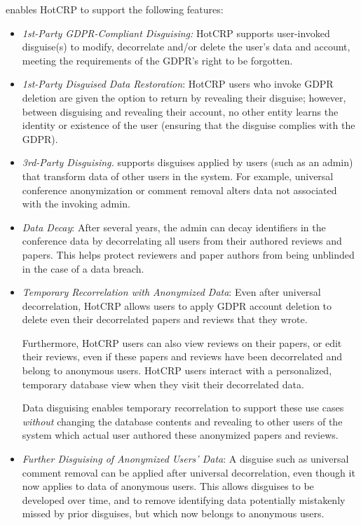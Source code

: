 \sys enables HotCRP to support the following features:
\begin{itemize}
    \item\emph{1st-Party GDPR-Compliant Disguising:}
HotCRP supports user-invoked disguise(s) to modify, decorrelate and/or delete the user's data and
account, meeting the requirements of the GDPR's right to be forgotten.

    \item \emph{1st-Party Disguised Data Restoration}: HotCRP users who invoke GDPR deletion are given the
        option to return by revealing their disguise; however, between disguising and revealing
        their account, no other entity learns the identity or existence of the user (ensuring that
        the disguise complies with the GDPR).

    \item\emph{3rd-Party Disguising.}
\sys supports disguises applied by users (such as an admin) that transform data of other users in the system. For example, universal conference anonymization or
    comment removal alters data not associated with the invoking admin.

\item \emph{Data Decay}: After several years, the admin can decay identifiers in the conference data
    by decorrelating all users from their authored reviews and papers.  This helps protect reviewers
        and paper authors from being unblinded in the case of a data breach.

\item \emph{Temporary Recorrelation with Anonymized Data}:
Even after universal decorrelation, HotCRP allows users to apply GDPR account
deletion to delete even their decorrelated papers and reviews that they wrote.
%

%
Furthermore, HotCRP users can also view reviews on their papers, or edit their reviews, even if
        these papers and reviews have been decorrelated and belong to anonymous users.  HotCRP users
        interact with a personalized, temporary database view when they visit their decorrelated
        data.

Data disguising enables temporary recorrelation to support these use cases \emph{without} changing
        the database contents and revealing to other users of the system
which actual user authored these anonymized papers and reviews.

\item \emph{Further Disguising of Anonymized Users' Data}: A disguise such as universal comment
        removal can be applied after universal decorrelation, even though it now applies to data of anonymous users.
This allows disguises to be developed over time, and to remove identifying data potentially mistakenly missed by prior
disguises, but which now belongs to anonymous users.
\end{itemize}

